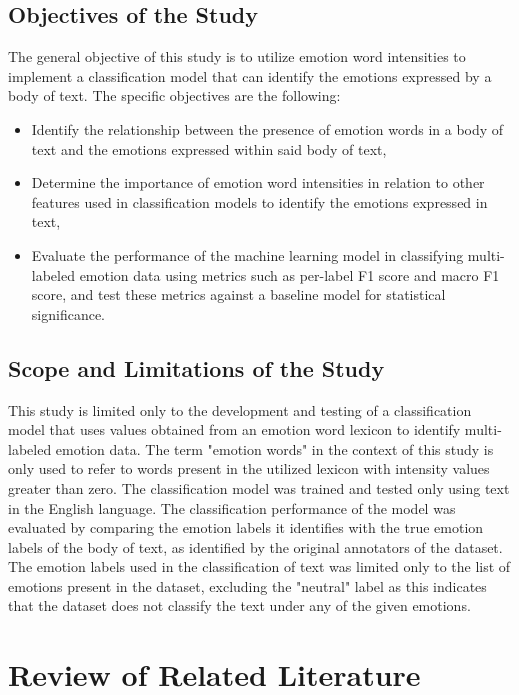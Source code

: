 \documentclass[journal]{./IEEE/IEEEtran}
\begin{document}
\subsection{Objectives of the Study}
\pubidadjcol The general objective of this study is to utilize emotion word intensities to implement a classification model that can identify the emotions expressed by a body of text. The specific objectives are the following:

\begin{itemize}
    \item{Identify the relationship between the presence of emotion words in a body of text and the emotions expressed within said body of text,}
    \item{Determine the importance of emotion word intensities in relation to other features used in classification models to identify the emotions expressed in text,}
    \item{Evaluate the performance of the machine learning model in classifying multi-labeled emotion data using metrics such as per-label F1 score and macro F1 score, and test these metrics against a baseline model for statistical significance.}
\end{itemize}

\subsection{Scope and Limitations of the Study}
This study is limited only to the development and testing of a classification model that uses values obtained from an emotion word lexicon to identify multi-labeled emotion data. The term "emotion words" in the context of this study is only used to refer to words present in the utilized lexicon with intensity values greater than zero. The classification model was trained and tested only using text in the English language. The classification performance of the model was evaluated by comparing the emotion labels it identifies with the true emotion labels of the body of text, as identified by the original annotators of the dataset. The emotion labels used in the classification of text was limited only to the list of emotions present in the dataset, excluding the "neutral" label as this indicates that the dataset does not classify the text under any of the given emotions.

\section{Review of Related Literature}
\end{document}
